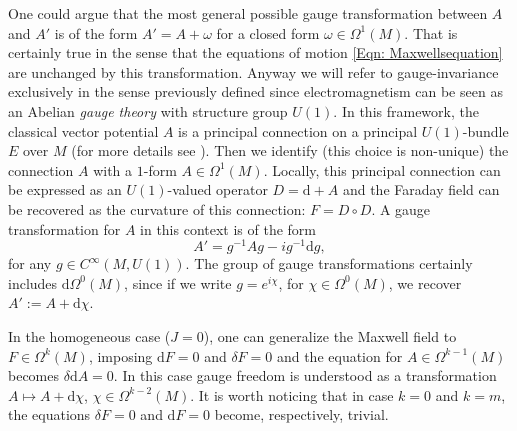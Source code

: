 One could argue that the most general possible gauge transformation between $A$ and $A'$ is of the form $A'=A+\omega$ for a closed form $\omega\in\Omega^1(M)$. That is certainly true in the sense that the equations of motion \eqref{Eqn: Maxwellsequation} are unchanged by this transformation. Anyway we will refer to gauge-invariance exclusively in the sense previously defined since electromagnetism can be seen as an Abelian \emph{gauge theory} with structure group $U(1)$.
In this framework, the classical vector potential $A$ is a principal connection on a principal $U(1)$-bundle $E$ over $M$ (for more details see \cite[Ch. 10]{Nakahara-90}). Then we identify (this choice is non-unique) the connection $A$ with a $1$-form $A\in \Omega^1(M)$. Locally, this principal connection can be expressed as an $U(1)$-valued operator $D=\mathrm{d}+ A$ and the Faraday field can be recovered as the curvature of this connection: $F=D\circ D$.  A gauge transformation for $A$ in this context is of the form
\begin{equation}\label{Eqn: gauge U(1)}
	A'=g^{-1}Ag-ig^{-1}\mathrm{d}g,
\end{equation}
for any $g\in C^\infty(M,U(1))$. The group of gauge transformations certainly includes $\mathrm{d}\Omega^0(M)$, since if we write $g=e^{i\chi}$, for $\chi\in\Omega^0(M)$, we recover $A':=A+\mathrm{d}\chi$.

\begin{remark}
	In the homogeneous case ($J=0$), one can generalize the Maxwell field to $F\in\Omega^k(M)$, imposing $\mathrm{d}F=0$ and $\delta F=0$ and the equation for $A\in\Omega^{k-1}(M)$ becomes $\delta\mathrm{d}A=0$. In this case gauge freedom is understood as a transformation $A\mapsto A+\mathrm{d}\chi$, $\chi\in\Omega^{k-2}(M)$. It is worth noticing that in case $k=0$ and $k=m$, the equations $\delta F=0$ and $\mathrm{d}F=0$ become, respectively, trivial.
\end{remark}

